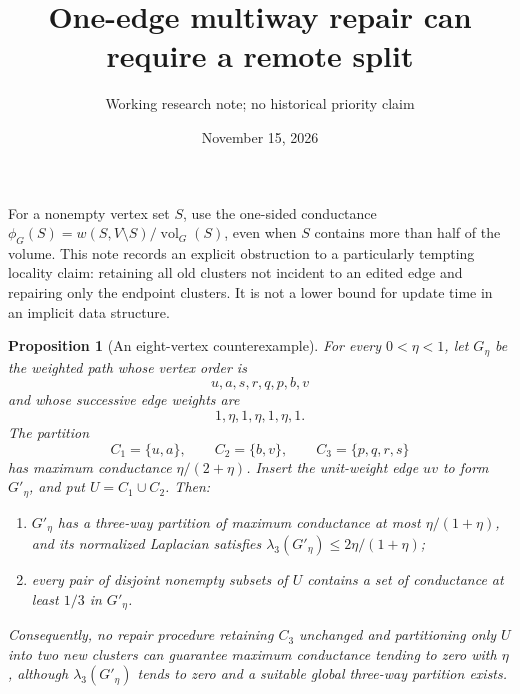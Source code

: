 \documentclass[11pt]{article}
\title{One-edge multiway repair can require a remote split}
\author{Working research note; no historical priority claim}
\date{November 15, 2026}
\newtheorem{proposition}{Proposition}
\newcommand{\vol}{\operatorname{vol}}
\begin{document}
\maketitle
For a nonempty vertex set $S$, use the one-sided conductance
$\phi_G(S)=w(S,V\setminus S)/\vol_G(S)$, even when $S$ contains more
than half of the volume. This note records an explicit obstruction to a
particularly tempting locality claim: retaining all old clusters not
incident to an edited edge and repairing only the endpoint clusters.
It is not a lower bound for update time in an implicit data structure.

\begin{proposition}[An eight-vertex counterexample]
For every $0<\eta<1$, let $G_\eta$ be the weighted path whose vertex
order is
\[
 u,a,s,r,q,p,b,v
\]
and whose successive edge weights are
\[
 1,\eta,1,\eta,1,\eta,1.
\]
The partition
\[
 C_1=\{u,a\},\qquad C_2=\{b,v\},\qquad
 C_3=\{p,q,r,s\}
\]
has maximum conductance $\eta/(2+\eta)$.
Insert the unit-weight edge $uv$ to form $G'_\eta$, and put
$U=C_1\cup C_2$. Then:
\begin{enumerate}
\item $G'_\eta$ has a three-way partition of maximum conductance
at most $\eta/(1+\eta)$, and its normalized Laplacian satisfies
$\lambda_3(G'_\eta)\le2\eta/(1+\eta)$;
\item every pair of disjoint nonempty subsets of $U$ contains a set
of conductance at least $1/3$ in $G'_\eta$.
\end{enumerate}
Consequently, no repair procedure retaining $C_3$ unchanged and
partitioning only $U$ into two new clusters can guarantee maximum
conductance tending to zero with $\eta$, although $\lambda_3(G'_\eta)$
tends to zero and a suitable global three-way partition exists.
\end{proposition}
\end{document}
